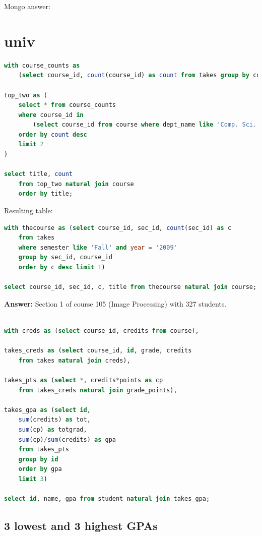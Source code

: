 \documentclass[11pt, oneside]{amsart}   	%
\begin{document}
Mongo answer:


\section{univ}

\begin{lstlisting}[language=SQL]
with course_counts as 
    (select course_id, count(course_id) as count from takes group by course_id),

top_two as (
    select * from course_counts 
    where course_id in 
        (select course_id from course where dept_name like 'Comp. Sci.')
    order by count desc
    limit 2
)

select title, count
    from top_two natural join course 
    order by title;
\end{lstlisting}

Resulting table: 

\begin{lstlisting}[language=SQL]
with thecourse as (select course_id, sec_id, count(sec_id) as c 
    from takes 
    where semester like 'Fall' and year = '2009'
    group by sec_id, course_id
    order by c desc limit 1)

select course_id, sec_id, c, title from thecourse natural join course;
\end{lstlisting}
\textbf{Answer: } Section 1 of course 105 (Image Processing) with 327 students. 

\begin{lstlisting}[language=SQL]

with creds as (select course_id, credits from course),

takes_creds as (select course_id, id, grade, credits 
    from takes natural join creds), 

takes_pts as (select *, credits*points as cp 
    from takes_creds natural join grade_points),

takes_gpa as (select id, 
    sum(credits) as tot, 
    sum(cp) as totgrad, 
    sum(cp)/sum(credits) as gpa 
    from takes_pts 
    group by id
    order by gpa
    limit 3)

select id, name, gpa from student natural join takes_gpa;

\end{lstlisting}


\subsection{3 lowest and 3 highest GPAs}
\end{document}
